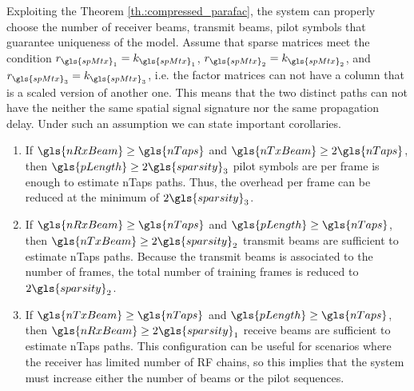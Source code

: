 \documentclass[conference]{IEEEtran}
\begin{document}
Exploiting the Theorem \ref{th.:compressed_parafac}, the system can properly
choose the number of receiver beams, transmit beams, pilot symbols that
guarantee uniqueness of the model. Assume that sparse matrices meet the condition $r_{\gls{spMtx}_1}=k_{\gls{spMtx}_1}$,
$r_{\gls{spMtx}_2}=k_{\gls{spMtx}_2}$, and
$r_{\gls{spMtx}_3}=k_{\gls{spMtx}_3}$, i.e. the factor matrices can not have a
column that is a scaled version of another one. This means that the two
distinct paths can not have the neither the
same spatial signal signature nor the same propagation delay.  Under such an
assumption we can state important corollaries.
\begin{enumerate}
\item If $\gls{nRxBeam}\geq\gls{nTaps}$ and   $\gls{nTxBeam}\geq 2\gls{nTaps}$, then
  $\gls{pLength} \geq 2\gls{sparsity}_3$ pilot symbols are per frame is enough to estimate
  \gls{nTaps} paths. Thus, the overhead per frame can be reduced at the minimum
  of $2\gls{sparsity}_3$.
\item If $\gls{nRxBeam} \geq \gls{nTaps}$ and   $\gls{pLength} \geq \gls{nTaps}$, then
  $\gls{nTxBeam} \geq 2\gls{sparsity}_2$ transmit beams are sufficient to estimate
  \gls{nTaps} paths. Because the  transmit beams is associated to the number of
  frames, the total number of training frames is reduced to $2\gls{sparsity}_2$.
\item If $\gls{nTxBeam} \geq \gls{nTaps}$ and   $\gls{pLength} \geq \gls{nTaps}$, then
  $\gls{nRxBeam} \geq 2\gls{sparsity}_1$ receive beams are sufficient to estimate
  \gls{nTaps} paths. This configuration can be useful for scenarios where the
  receiver has limited number of \gls{RF} chains, so this implies that the
  system must increase either the number of beams or the pilot sequences.
\end{enumerate}
\end{document}
